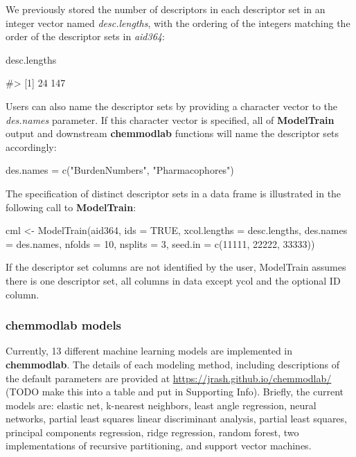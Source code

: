 We previously stored the number of descriptors in each descriptor set in
an integer vector named \textit{desc.lengths}, with the ordering of the
integers matching the order of the descriptor sets in \textit{aid364}:

\begin{Schunk}
\begin{Sinput}
desc.lengths
\end{Sinput}
\begin{Soutput}
#> [1]  24 147
\end{Soutput}
\end{Schunk}

Users can also name the descriptor sets by providing a character vector
to the \textit{des.names} parameter. If this character vector is
specified, all of \textbf{ModelTrain} output and downstream
\textbf{chemmodlab} functions will name the descriptor sets accordingly:

\begin{Schunk}
\begin{Sinput}
des.names = c("BurdenNumbers", "Pharmacophores")
\end{Sinput}
\end{Schunk}

The specification of distinct descriptor sets in a data frame is
illustrated in the following call to \textbf{ModelTrain}:

\begin{Schunk}
\begin{Sinput}
cml <- ModelTrain(aid364, ids = TRUE, xcol.lengths = desc.lengths, 
                  des.names = des.names, nfolds = 10, nsplits = 3,
                  seed.in = c(11111, 22222, 33333))
\end{Sinput}
\end{Schunk}

If the descriptor set columns are not identified by the user, ModelTrain
assumes there is one descriptor set, all columns in data except ycol and
the optional ID column.

\subsubsection{chemmodlab models}\label{chemmodlab-models}

Currently, 13 different machine learning models are implemented in
\textbf{chemmodlab}. The details of each modeling method, including
descriptions of the default parameters are provided at
\url{https://jrash.github.io/chemmodlab/} (TODO make this into a table
and put in Supporting Info). Briefly, the current models are: elastic
net, k-nearest neighbors, least angle regression, neural networks,
partial least squares linear discriminant analysis, partial least
squares, principal components regression, ridge regression, random
forest, two implementations of recursive partitioning, and support
vector machines.

